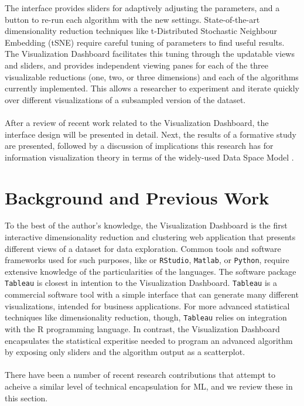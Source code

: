 \documentclass{sigchi}
\begin{document}
%
The interface provides sliders for adaptively adjusting the parameters, and a button to re-run each algorithm with the new settings. %
%
State-of-the-art dimensionality reduction techniques like t-Distributed Stochastic Neighbour Embedding (tSNE) \cite{maaten2008visualizing} require careful tuning of parameters to find useful results. %
%
The Visualization Dashboard facilitates this tuning through the updatable views and sliders, and provides independent viewing panes for each of the three visualizable reductions (one, two, or three dimensions) and each of the algorithms currently implemented. %
%
This allows a researcher to experiment and iterate quickly over different visualizations of a subsampled version of the dataset.%
%
\\\\
%
After a review of recent work related to the Visualization Dashboard, the interface design will be presented in detail. Next, the results of a formative study are presented, followed by a discussion of implications this research has for information visualization theory in terms of the widely-used Data Space Model \cite{chi1999framework}.
%
%
%
\section{Background and Previous Work}
%
%
%
To the best of the author's knowledge, the Visualization Dashboard is the first interactive dimensionality reduction and clustering web application that presents different views of a dataset for data exploration. %
%
Common tools and software frameworks used for such purposes, like or \texttt{RStudio}, \texttt{Matlab}, or \texttt{Python}, require extensive knowledge of the particularities of the languages. %
%
The software package \texttt{Tableau} \cite{tableau} is closest in intention to the Visualization Dashboard. %
\texttt{Tableau} is a commercial software tool with a simple interface that can generate many different visualizations, intended for business applications. %
For more advanced statistical techniques like dimensionality reduction, though, \texttt{Tableau} relies on integration with the R programming language. %
%
In contrast, the Visualization Dashboard encapsulates the statistical experitise needed to program an advanced algorithm by exposing only sliders and the algorithm output as a scatterplot. %
%
\\\\
%
There have been a number of recent research contributions that attempt to acheive a similar level of technical encapsulation for ML, and we review these in this section. %
%
%
\end{document}
